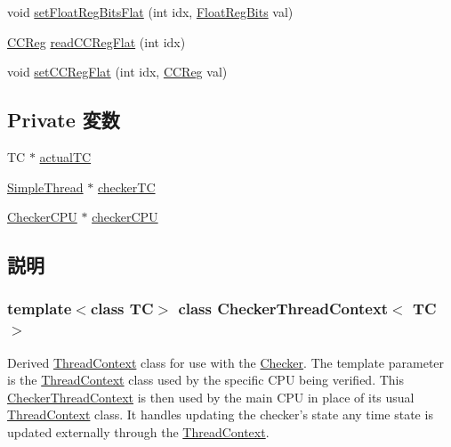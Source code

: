 \begin{DoxyCompactItemize}
\item 
void \hyperlink{classCheckerThreadContext_acd974292ff0461c2e94c0b5a1126b503}{setFloatRegBitsFlat} (int idx, \hyperlink{classThreadContext_aab5eeae86499f9bfe15ef79360eccc64}{FloatRegBits} val)
\item 
\hyperlink{classThreadContext_a0c9de550a32808e6a25b54b6c791d5ab}{CCReg} \hyperlink{classCheckerThreadContext_a78f8bb511732f8abab3bd11a18d32072}{readCCRegFlat} (int idx)
\item 
void \hyperlink{classCheckerThreadContext_a6dec2284dd5904f992642f24bb289f14}{setCCRegFlat} (int idx, \hyperlink{classThreadContext_a0c9de550a32808e6a25b54b6c791d5ab}{CCReg} val)
\end{DoxyCompactItemize}
\subsection*{Private 変数}
\begin{DoxyCompactItemize}
\item 
TC $\ast$ \hyperlink{classCheckerThreadContext_af006a89ce9ad7b3b522cba1d69d950da}{actualTC}
\item 
\hyperlink{classSimpleThread}{SimpleThread} $\ast$ \hyperlink{classCheckerThreadContext_ac3681193489e5a56c785bbac5564b9a5}{checkerTC}
\item 
\hyperlink{classCheckerCPU}{CheckerCPU} $\ast$ \hyperlink{classCheckerThreadContext_af7c19dfd3eac49811831e9bc4323a60a}{checkerCPU}
\end{DoxyCompactItemize}


\subsection{説明}
\subsubsection*{template$<$class TC$>$ class CheckerThreadContext$<$ TC $>$}

Derived \hyperlink{classThreadContext}{ThreadContext} class for use with the \hyperlink{classChecker}{Checker}. The template parameter is the \hyperlink{classThreadContext}{ThreadContext} class used by the specific CPU being verified. This \hyperlink{classCheckerThreadContext}{CheckerThreadContext} is then used by the main CPU in place of its usual \hyperlink{classThreadContext}{ThreadContext} class. It handles updating the checker's state any time state is updated externally through the \hyperlink{classThreadContext}{ThreadContext}. 

